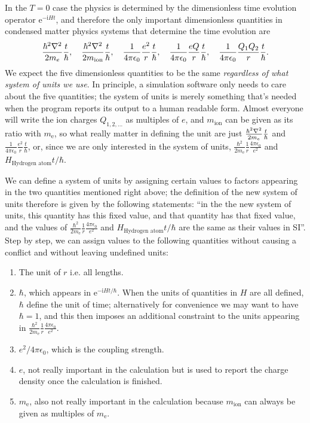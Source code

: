 \documentclass[hyperref, a4paper, 12pt]{report}
\newcommand*{\ii}{\mathrm{i}}
\newcommand*{\ee}{\mathrm{e}}
\begin{document}
In the $T=0$ case the physics is determined by 
the dimensionless time evolution operator $\ee^{- \ii H t}$,
and therefore the only important dimensionless quantities in condensed matter physics systems 
that determine the time evolution are 
\begin{equation}
    \frac{\hbar^2 \laplacian}{2 m_e} \frac{t}{\hbar}, 
    \quad \frac{\hbar^2 \laplacian}{2 m_{\text{ion}}} \frac{t}{\hbar}, 
    \quad \frac{1}{4 \pi \epsilon_0} \frac{e^2}{r} \frac{t}{\hbar}, 
    \quad \frac{1}{4 \pi \epsilon_0} \frac{eQ}{r} \frac{t}{\hbar},
    \quad \frac{1}{4 \pi \epsilon_0} \frac{Q_1 Q_2}{r} \frac{t}{\hbar}. 
    \label{eq:quantities}
\end{equation}
We expect the five dimensionless quantities to be the same 
\emph{regardless of what system of units we use}.
In principle, a simulation software only needs to care about the five quantities; 
the system of units is merely something that's needed when 
the program reports its output to a human readable form.
Almost everyone will write the ion charges $Q_{1, 2, \ldots}$ 
as multiples of $e$, 
and $m_{\text{ion}}$ can be given as its ratio with $m_{\text{e}}$, 
so what really matter in defining the unit are just  
$\frac{\hbar^2 \laplacian}{2 m_e} \frac{t}{\hbar}$ and 
$\frac{1}{4 \pi \epsilon_0} \frac{e^2}{r} \frac{t}{\hbar}$, 
or, since we are only interested in the system of units, 
$\frac{\hbar^2}{2m_\text{e}} \frac{1}{r} \frac{4\pi \epsilon_0}{e^2}$ 
and $H_{\text{Hydrogen atom}} t / \hbar$.

We can define a system of units by 
assigning certain values to factors appearing in the two quantities mentioned right above;
the definition of the new system of units therefore is given by the following statements:
``in the the new system of units, 
this quantity has this fixed value, and that quantity has that fixed value, 
and the values of $\frac{\hbar^2}{2m_\text{e}} \frac{1}{r} \frac{4\pi \epsilon_0}{e^2}$ 
and $H_{\text{Hydrogen atom}} t / \hbar$ 
are the same as their values in SI''.
Step by step, we can assign values to the following quantities 
without causing a conflict and without leaving undefined units:
\begin{enumerate}
    \item The unit of $r$ i.e. all lengths.  
    \item $\hbar$, which appears in $\ee^{- \ii H t / \hbar}$. 
    When the units of quantities in $H$ are all defined, 
    $\hbar$ define the unit of time; 
    alternatively for convenience we may want to have $\hbar = 1$, 
    and this then imposes an additional constraint to 
    the units appearing in $\frac{\hbar^2}{2m_\text{e}} \frac{1}{r} \frac{4\pi \epsilon_0}{e^2}$.
    \item $e^2 / 4\pi \epsilon_0$, which is the coupling strength.
    \item $e$, not really important in the calculation 
    but is used to report the charge density once the calculation is finished.
    \item $m_\text{e}$, also not really important in the calculation because  
    $m_{\text{ion}}$ can always be given as multiples of $m_{\text{e}}$.
\end{enumerate}
\end{document}
